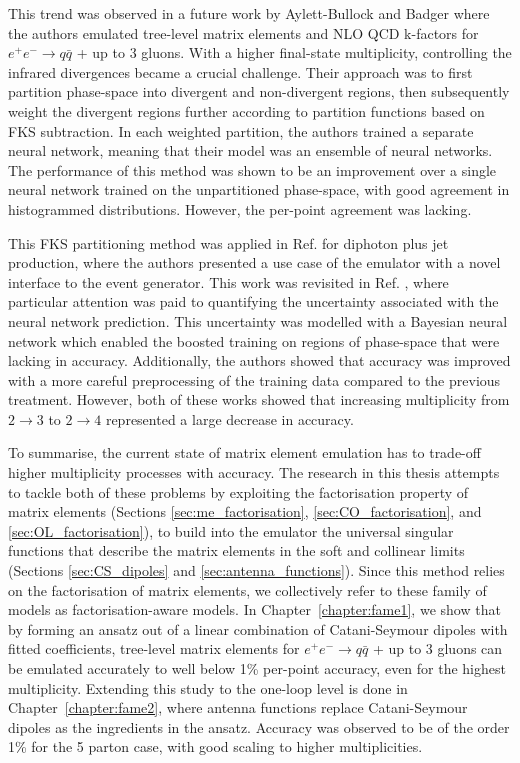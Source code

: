 \documentclass[main.tex]{subfiles}
\begin{document}
    This trend was observed in a future work by Aylett-Bullock
    and Badger \cite{Badger:2020uow} where the authors emulated tree-level
    matrix elements and NLO QCD k-factors for $e^{+}e^{-} \rightarrow q \bar{q}$ +
    up to 3 gluons. With a higher final-state multiplicity, controlling
    the infrared divergences became a crucial challenge.
    Their approach was to first partition phase-space
    into divergent and non-divergent regions, then subsequently
    weight the divergent regions further according to partition functions
    based on FKS subtraction.
    In each weighted partition, the authors trained a separate neural network,
    meaning that their model was an ensemble of neural networks.
    The performance of this method was shown to be an improvement
    over a single neural network trained on the unpartitioned phase-space,
    with good agreement in histogrammed distributions. However,
    the per-point agreement was lacking.

    This FKS partitioning method was applied in Ref. \cite{Aylett-Bullock:2021hmo}
    for diphoton plus jet production, where the authors presented a
    use case of the emulator with a novel interface to the {\Sherpa} event generator.
    This work was revisited in Ref. \cite{Badger:2022hwf},
    where particular attention was paid to quantifying the uncertainty associated
    with the neural network prediction. This uncertainty was
    modelled with a Bayesian neural network which enabled
    the boosted training on regions of phase-space that were
    lacking in accuracy. Additionally, the authors showed
    that accuracy was improved with a more careful
    preprocessing of the training data compared to
    the previous treatment.
    However, both of these works showed that increasing
    multiplicity from $2 \rightarrow 3$ to $2 \rightarrow 4$
    represented a large decrease in accuracy.

    To summarise, the current state of matrix element
    emulation has to trade-off higher multiplicity processes
    with accuracy. The research in this thesis attempts to
    tackle both of these problems by exploiting the factorisation
    property of matrix elements (Sections \ref{sec:me_factorisation},
    \ref{sec:CO_factorisation}, and \ref{sec:OL_factorisation}),
    to build into the emulator the universal singular functions
    that describe the matrix elements in the soft and collinear limits
    (Sections \ref{sec:CS_dipoles} and \ref{sec:antenna_functions}).
    Since this method relies on the factorisation of matrix
    elements, we collectively refer to these family of models
    as factorisation-aware models.
    In Chapter~\ref{chapter:fame1}, we show that by forming an ansatz
    out of a linear combination of Catani-Seymour dipoles with
    fitted coefficients, tree-level
    matrix elements for $e^{+}e^{-} \rightarrow q \bar{q}$ + up to 3 gluons
    can be emulated accurately to well below 1\% per-point accuracy,
    even for the highest multiplicity. Extending this study
    to the one-loop level is done in Chapter~\ref{chapter:fame2},
    where antenna functions replace Catani-Seymour dipoles as
    the ingredients in the ansatz. Accuracy was observed to be of the
    order 1\% for the 5 parton case, with good scaling
    to higher multiplicities.
\end{document}
